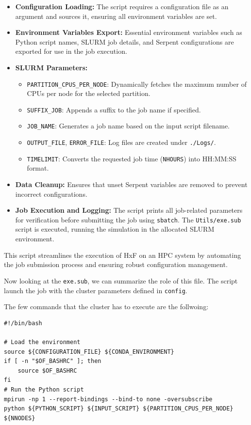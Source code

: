 \documentclass{article}
\begin{document}
\begin{itemize}
    \item \textbf{Configuration Loading:}  
    The script requires a configuration file as an argument and sources it, ensuring all environment variables are set.

    \item \textbf{Environment Variables Export:}  
    Essential environment variables such as Python script names, SLURM job details, and Serpent configurations are exported for use in the job execution.

    \item \textbf{SLURM Parameters:}  
    \begin{itemize}
        \item \texttt{PARTITION\_CPUS\_PER\_NODE}: Dynamically fetches the maximum number of CPUs per node for the selected partition.
        \item \texttt{SUFFIX\_JOB}: Appends a suffix to the job name if specified.
        \item \texttt{JOB\_NAME}: Generates a job name based on the input script filename.
        \item \texttt{OUTPUT\_FILE}, \texttt{ERROR\_FILE}: Log files are created under \texttt{./Logs/}.
        \item \texttt{TIMELIMIT}: Converts the requested job time (\texttt{NHOURS}) into HH:MM:SS format.
    \end{itemize}

    \item \textbf{Data Cleanup:}  
    Ensures that unset Serpent variables are removed to prevent incorrect configurations.

    \item \textbf{Job Execution and Logging:}  
    The script prints all job-related parameters for verification before submitting the job using \texttt{sbatch}. The \texttt{Utils/exe.sub} script is executed, running the simulation in the allocated SLURM environment.
\end{itemize}

This script streamlines the execution of HxF on an HPC system by automating the job submission process and ensuring robust configuration management.

Now looking at the \texttt{exe.sub}, we can summarize the role of this file. The script launch the job with the cluster parameters defined in \texttt{config}. 

The few commands that the cluster has to execute are the follwoing:
\begin{lstlisting}[style=pythonstyle]
    #!/bin/bash

# Load the environment
source ${CONFIGURATION_FILE} ${CONDA_ENVIRONMENT}
if [ -n "$OF_BASHRC" ]; then
    source $OF_BASHRC
fi
# Run the Python script
mpirun -np 1 --report-bindings --bind-to none -oversubscribe 
python ${PYTHON_SCRIPT} ${INPUT_SCRIPT} ${PARTITION_CPUS_PER_NODE} ${NNODES}
\end{lstlisting}
\end{document}
